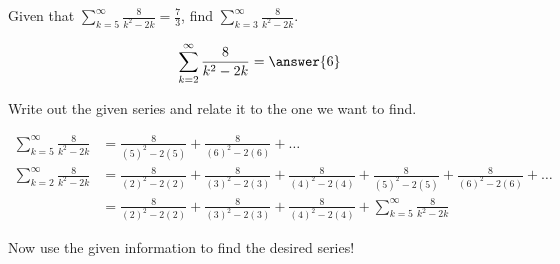 \documentclass{ximera}
\author{Jim Talamo}
\begin{document}
\begin{exercise}
Given that $\sum_{k=5}^{\infty} \frac{8}{k^2-2k} = \frac{7}{3}$, find $\sum_{k=3}^{\infty} \frac{8}{k^2-2k}$.

\[
\sum_{k=2}^{\infty}\frac{8}{k^2-2k} = \answer{6}
\]

\begin{hint}
Write out the given series and relate it to the one we want to find.

\begin{align*}
\sum_{k=5}^{\infty}\frac{8}{k^2-2k}&=\frac{8}{(5)^2-2(5)} + \frac{8}{(6)^2-2(6)} + \ldots \\
\sum_{k=2}^{\infty}\frac{8}{k^2-2k}&=\frac{8}{(2)^2-2(2)} + \frac{8}{(3)^2-2(3)} +\frac{8}{(4)^2-2(4)}+\frac{8}{(5)^2-2(5)}+\frac{8}{(6)^2-2(6)}+  \ldots \\
&=\frac{8}{(2)^2-2(2)} + \frac{8}{(3)^2-2(3)} +\frac{8}{(4)^2-2(4)}+\sum_{k=5}^{\infty}\frac{8}{k^2-2k}
\end{align*}
  
 Now use the given information to find the desired series!
 \end{hint}

\end{exercise}
\end{document}
